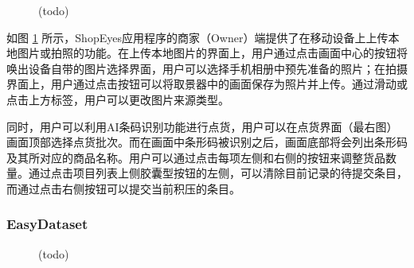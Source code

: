 \begin{figure}[htbp]
    \hfill
	\caption{(todo)}
	\label{fig:seo}
\end{figure}

如图 \ref{fig:seo} 所示，ShopEyes应用程序的商家（Owner）端提供了在移动设备上上传本地图片或拍照的功能。在上传本地图片的界面上，用户通过点击画面中心的按钮将唤出设备自带的图片选择界面，用户可以选择手机相册中预先准备的照片；在拍摄界面上，用户通过点击按钮可以将取景器中的画面保存为照片并上传。通过滑动或点击上方标签，用户可以更改图片来源类型。

同时，用户可以利用AI条码识别功能进行点货，用户可以在点货界面（最右图）画面顶部选择点货批次。而在画面中条形码被识别之后，画面底部将会列出条形码及其所对应的商品名称。用户可以通过点击每项左侧和右侧的按钮来调整货品数量。通过点击项目列表上侧胶囊型按钮的左侧，可以清除目前记录的待提交条目，而通过点击右侧按钮可以提交当前积压的条目。

\subsubsection{EasyDataset}

\begin{figure}[htbp]
    \centering
    \hfill
	\caption{(todo)}
	\label{fig:ed-nd}
\end{figure}

